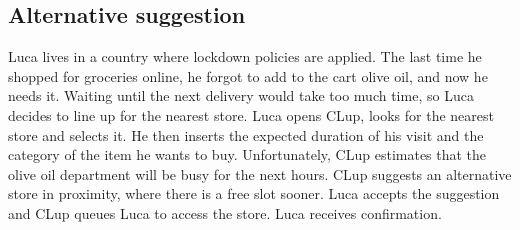 \documentclass[../../main.tex]{subfiles}
\begin{document}
    \subsection{Alternative suggestion}

    Luca lives in a country where lockdown policies are applied. The last time he shopped for groceries online, 
    he forgot to add to the cart olive oil, and now he needs it. Waiting until the next delivery would take too much time, 
    so Luca decides to line up for the nearest store. 
    Luca opens CLup, looks for the nearest store and selects it. 
    He then inserts the expected duration of his visit and the category of the item he wants to buy. 
    Unfortunately, CLup estimates that the olive oil department will be busy for the next hours. 
    CLup suggests an alternative store in proximity, where there is a free slot sooner. 
    Luca accepts the suggestion and CLup queues Luca to access the store. Luca receives confirmation.
\end{document}
